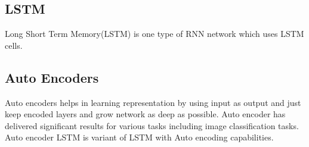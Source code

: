 \subsection{LSTM}
Long Short Term Memory(LSTM) is one type of RNN network which uses LSTM cells.

\subsection{Auto Encoders}
Auto encoders helps in learning representation by using input as output and just keep encoded layers and grow network as deep as possible. Auto encoder has delivered significant results for various tasks including image classification tasks. Auto encoder LSTM is variant of LSTM with Auto encoding capabilities.





\doublespacing\normalsize
